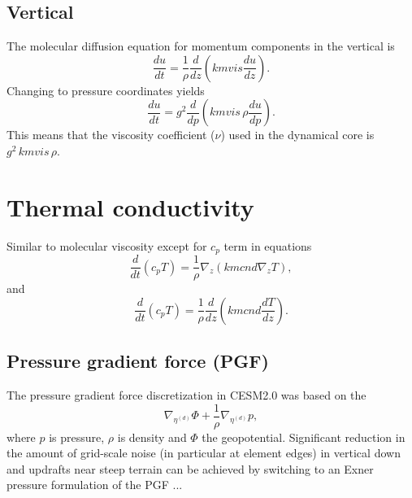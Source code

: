 \documentclass[draft]{agujournal2019}
\begin{document}
\subsection{Vertical}
The molecular diffusion equation for momentum components in the vertical is
\begin{equation}
    \frac{du}{dt}=\frac{1}{\rho}\frac{d}{dz}\left( kmvis \frac{du}{dz}\right).
\end{equation}
Changing to pressure coordinates yields
\begin{equation}
    \frac{du}{dt}=g^2\frac{d}{dp}\left( kmvis \, \rho\frac{du}{dp}\right).
\end{equation}
This means that the viscosity coefficient ($\nu$) used in the dynamical core is $g^2 \, kmvis \, \rho$.
\section{Thermal conductivity}
Similar to molecular viscosity except for $c_p$ term in equations
\begin{equation}
    \frac{d}{dt}\left( c_pT\right)=\frac{1}{\rho}\nabla_z \left( kmcnd \nabla_z T\right),
\end{equation}
and
\begin{equation}
    \frac{d}{dt}\left( c_pT\right)=\frac{1}{\rho}\frac{d}{dz}\left( kmcnd \frac{dT}{dz}\right).
\end{equation}

\subsection{Pressure gradient force (PGF)}
The pressure gradient force discretization in CESM2.0 was based on the 
\begin{equation}
\nabla_{\eta^{(d)}} \Phi + \frac{1}{\rho} \nabla_{\eta^{(d)}} p,
\end{equation}
where $p$ is pressure, $\rho$ is density and $\Phi$ the geopotential. Significant reduction in the amount of grid-scale noise (in particular at element edges) in vertical down and updrafts near steep terrain can be achieved by switching to an Exner pressure formulation of the PGF ...



%
%
%
\end{document}
